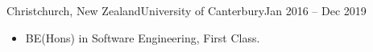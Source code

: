 \begin{cvsubsection}[2]{Christchurch, New Zealand}{University of Canterbury}{Jan 2016 -- Dec 2019}
	\begin{itemize}
		\item BE(Hons) in Software Engineering, First Class.
	\end{itemize}
\end{cvsubsection}